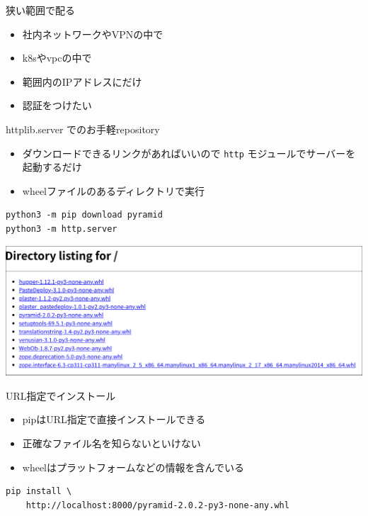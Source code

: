 \documentclass[presentation]{beamer}
\begin{document}
\begin{frame}[label={sec:orgf29665f}]{狭い範囲で配る}
\begin{itemize}
\item 社内ネットワークやVPNの中で
\item k8sやvpcの中で
\item 範囲内のIPアドレスにだけ
\item 認証をつけたい
\end{itemize}
\end{frame}

\begin{frame}[label={sec:orge6c5175},fragile]{httplib.server でのお手軽repository}
 \begin{itemize}
\item ダウンロードできるリンクがあればいいので \texttt{http} モジュールでサーバーを起動するだけ
\item wheelファイルのあるディレクトリで実行
\end{itemize}

\begin{verbatim}
python3 -m pip download pyramid
python3 -m http.server
\end{verbatim}

\begin{center}
\includegraphics[width=.9\linewidth]{./http-server-simple-repository.png}
\end{center}
\end{frame}

\begin{frame}[label={sec:org03ca12f},fragile]{URL指定でインストール}
 \begin{itemize}
\item pipはURL指定で直接インストールできる
\item 正確なファイル名を知らないといけない
\item wheelはプラットフォームなどの情報を含んでいる
\end{itemize}

\begin{verbatim}
pip install \
    http://localhost:8000/pyramid-2.0.2-py3-none-any.whl
\end{verbatim}
\end{frame}
\end{document}
